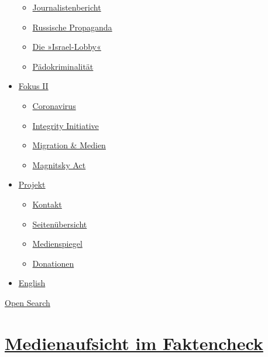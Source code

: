 \begin{itemize}
  \begin{itemize}
  \tightlist
  \item
    \href{https://swprs.org/bericht-eines-journalisten/}{Journalistenbericht}
  \item
    \href{https://swprs.org/russische-propaganda/}{Russische Propaganda}
  \item
    \href{https://swprs.org/die-israel-lobby-fakten-und-mythen/}{Die
    »Israel-Lobby«}
  \item
    \href{https://swprs.org/geopolitik-und-paedokriminalitaet/}{Pädokriminalität}
  \end{itemize}
\item
  \href{https://swprs.org/migration-und-medien/}{Fokus II}

  \begin{itemize}
  \tightlist
  \item
    \href{https://swprs.org/covid-19-hinweis-ii/}{Coronavirus}
  \item
    \href{https://swprs.org/die-integrity-initiative/}{Integrity
    Initiative}
  \item
    \href{https://swprs.org/migration-und-medien/}{Migration \& Medien}
  \item
    \href{https://swprs.org/der-fall-magnitsky/}{Magnitsky Act}
  \end{itemize}
\item
  \href{https://swprs.org/kontakt/}{Projekt}

  \begin{itemize}
  \tightlist
  \item
    \href{https://swprs.org/kontakt/}{Kontakt}
  \item
    \href{https://swprs.org/uebersicht/}{Seitenübersicht}
  \item
    \href{https://swprs.org/medienspiegel/}{Medienspiegel}
  \item
    \href{https://swprs.org/donationen/}{Donationen}
  \end{itemize}
\item
  \href{https://swprs.org/contact/}{English}
\end{itemize}

\protect\hyperlink{}{Open Search}

\hypertarget{medienaufsicht-im-faktencheck}{%
\section{\texorpdfstring{\href{https://swprs.org/2017/03/01/medienaufsicht-faktencheck/}{Medienaufsicht
im
Faktencheck}}{Medienaufsicht im Faktencheck}}\label{medienaufsicht-im-faktencheck}}

